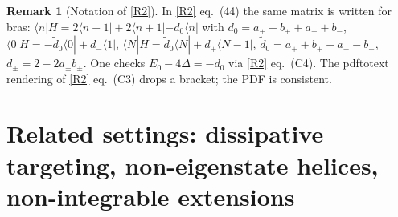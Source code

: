 \documentclass[11pt,a4paper]{article}
\theoremstyle{definition}
\newtheorem{remark}[theorem]{Remark}
\begin{document}
\begin{remark}[Notation of \ref{R2}]
In \ref{R2} eq.~(44) the same matrix is written for bras: $\langle n|H=2\langle n-1|+2\langle n+1|-d_0\langle n|$ with $d_0=a_++b_++a_-+b_-$, $\langle0|H=-\tilde d_0\langle0|+d_-\langle1|$, $\langle N|H=\tilde d_0\langle N|+d_+\langle N-1|$, $\tilde d_0=a_++b_+-a_--b_-$, $d_\pm=2-2a_\pm b_\pm$. One checks $E_0-4\Delta=-d_0$ via \ref{R2} eq.~(C4). The pdftotext rendering of \ref{R2} eq.~(C3) drops a bracket; the PDF is consistent.
\end{remark}

\section{Related settings: dissipative targeting, non-eigenstate helices, non-integrable extensions}\label{sec:related}
\end{document}
